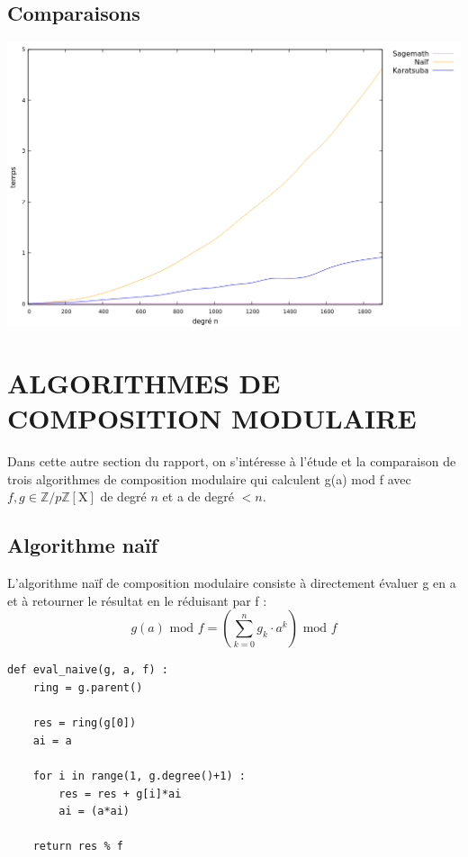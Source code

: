 \documentclass[a4paper]{article}
\begin{document}
\subsection{Comparaisons}

\includegraphics[scale=0.5, center]{multi.png}

\section{ALGORITHMES DE COMPOSITION MODULAIRE}

Dans cette autre section du rapport, on s'intéresse à l'étude et la comparaison de trois algorithmes de composition modulaire qui calculent g(a) mod f avec 
$f,g \in \mathbb{Z}/p\mathbb{Z}[\mathrm{X}]$ de degré $n$ et a de degré $< n$.



\subsection{Algorithme naïf}

L'algorithme naïf de composition modulaire consiste à directement évaluer g en a et à retourner le résultat en le réduisant par f :
\[
g(a)\text{ mod }f = \left(\sum_{k=0}^n g_k \cdot a^k\right) \text{ mod }f    
\]

\begin{lstlisting}[title={naive}]
def eval_naive(g, a, f) :
	ring = g.parent()

	res = ring(g[0])
	ai = a
	
    for i in range(1, g.degree()+1) :
		res = res + g[i]*ai
		ai = (a*ai)

	return res % f
\end{lstlisting}
\end{document}

